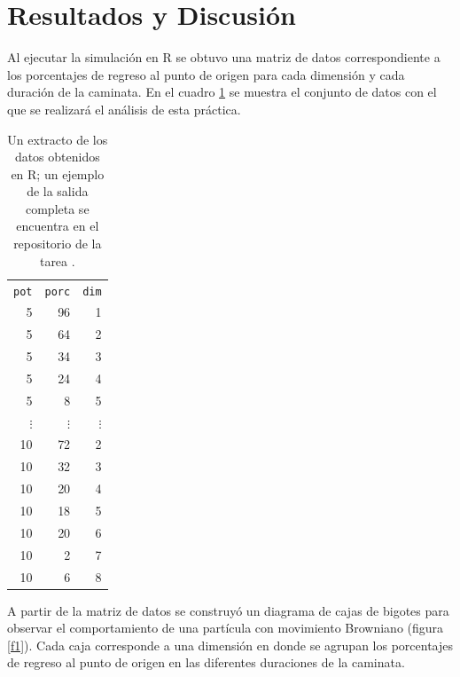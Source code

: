 ﻿\documentclass{article}
\begin{document}
\section{Resultados y Discusi\'on}\label{res}

Al ejecutar la simulaci\'on en R se obtuvo una matriz de datos
correspondiente a los porcentajes de regreso al punto de origen para
cada dimensi\'on y cada duraci\'on de la caminata.  En el cuadro \ref{t1} se
muestra el conjunto de datos con el que se realizar\'a el an\'alisis
de esta pr\'actica.

\begin{table} 
 \caption{Un extracto de los datos obtenidos en R; un ejemplo de la
  salida completa se encuentra en el repositorio de la tarea
  \cite{repo1}.}
 \label{t1}
 \begin{center}
 \begin{tabular}{rrr}
\texttt{pot} & \texttt{porc} & \texttt{dim} \\
  5 & 96 & 1 \\
  5 & 64 & 2 \\
  5 & 34 & 3 \\
  5 & 24 & 4 \\
  5 &  8 & 5 \\
  $\vdots$ &   $\vdots$ &   $\vdots$ \\
 10 & 72 & 2 \\
 10 & 32 & 3 \\
 10 & 20 & 4 \\
 10 & 18 & 5 \\
 10 & 20 & 6 \\
 10 &  2 & 7 \\
 10 &  6 & 8
\end{tabular}
\end{center}
\end{table}

A partir de la matriz de datos se construy\'o un diagrama de cajas de
bigotes para observar el comportamiento de una part\'icula con
movimiento Browniano (figura \ref{f1}). Cada caja corresponde a una
dimensi\'on en donde se agrupan los porcentajes de regreso al punto de
origen en las diferentes duraciones de la caminata.
\end{document}
